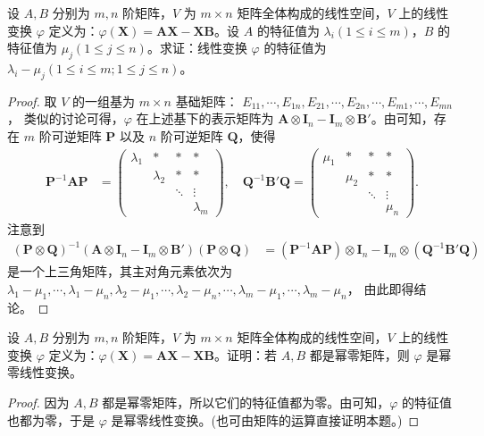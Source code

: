 \documentclass[../../main.tex]{subfiles}
\begin{document}
\begin{proposition}\label{proposition:线性变换AX-XB的表示矩阵和特征值}
设 $A,B$ 分别为 $m,n$ 阶矩阵，$V$ 为 $m \times n$ 矩阵全体构成的线性空间，$V$ 上的线性变换 $\varphi$ 定义为：$\varphi(\boldsymbol{X}) = \boldsymbol{AX} - \boldsymbol{XB}$。设 $A$ 的特征值为 $\lambda_i (1 \leq i \leq m)$，$B$ 的特征值为 $\mu_j (1 \leq j \leq n)$。求证：线性变换 $\varphi$ 的特征值为 $\lambda_i - \mu_j (1 \leq i \leq m; 1 \leq j \leq n)$。
\end{proposition}
\begin{proof}
取 $V$ 的一组基为 $m \times n$ 基础矩阵：
$E_{11},\cdots, E_{1n}, E_{21},\cdots, E_{2n},\cdots, E_{m1},\cdots, E_{mn}$，
类似的讨论可得，$\varphi$ 在上述基下的表示矩阵为 $\boldsymbol{A} \otimes \boldsymbol{I}_n - \boldsymbol{I}_m \otimes \boldsymbol{B}'$。由可知，存在 $m$ 阶可逆矩阵 $\boldsymbol{P}$ 以及 $n$ 阶可逆矩阵 $\boldsymbol{Q}$，使得
\begin{align*}
\boldsymbol{P}^{-1}\boldsymbol{AP} &= 
\begin{pmatrix}
\lambda_1 & * & * & * \\
 & \lambda_2 & * & * \\
 & & \ddots & \vdots \\
 & & & \lambda_m
\end{pmatrix}, \quad
\boldsymbol{Q}^{-1}\boldsymbol{B}'\boldsymbol{Q} = 
\begin{pmatrix}
\mu_1 & * & * & * \\
 & \mu_2 & * & * \\
 & & \ddots & \vdots \\
 & & & \mu_n
\end{pmatrix}.
\end{align*}
注意到
\begin{align*}
(\boldsymbol{P} \otimes \boldsymbol{Q})^{-1}(\boldsymbol{A} \otimes \boldsymbol{I}_n - \boldsymbol{I}_m \otimes \boldsymbol{B}')(\boldsymbol{P} \otimes \boldsymbol{Q}) 
&= (\boldsymbol{P}^{-1}\boldsymbol{AP}) \otimes \boldsymbol{I}_n - \boldsymbol{I}_m \otimes (\boldsymbol{Q}^{-1}\boldsymbol{B}'\boldsymbol{Q})
\end{align*}
是一个上三角矩阵，其主对角元素依次为
$\lambda_1 - \mu_1,\cdots, \lambda_1 - \mu_n, \lambda_2 - \mu_1,\cdots, \lambda_2 - \mu_n,\cdots, \lambda_m - \mu_1,\cdots, \lambda_m - \mu_n$，
由此即得结论。
\end{proof}

\begin{example}
设 $A,B$ 分别为 $m,n$ 阶矩阵，$V$ 为 $m \times n$ 矩阵全体构成的线性空间，$V$ 上的线性变换 $\varphi$ 定义为：$\varphi(\boldsymbol{X}) = \boldsymbol{AX} - \boldsymbol{XB}$。证明：若 $A,B$ 都是幂零矩阵，则 $\varphi$ 是幂零线性变换。
\end{example}
\begin{proof}
因为 $A,B$ 都是幂零矩阵，所以它们的特征值都为零。由可知，$\varphi$ 的特征值也都为零，于是 $\varphi$ 是幂零线性变换。(也可由矩阵的运算直接证明本题。)
\end{proof}
\end{document}
